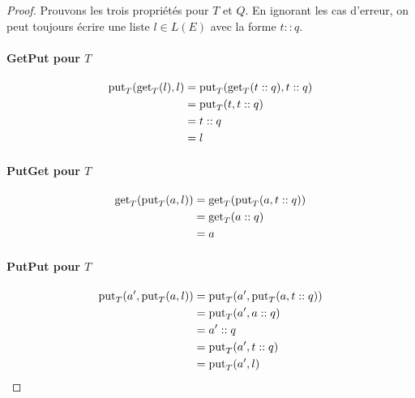 \begin{proof}%

Prouvons les trois propriétés pour $T$ et $Q$. En ignorant les cas d'erreur, on
peut toujours écrire une liste $l ∈ L(E)$ avec la forme $t::q$.

\paragraph{GetPut pour $T$}%

\begin{align*}
\mathrm{put}_{T}(\mathrm{get}_{T}(l), l) & = \mathrm{put}_{T}(\mathrm{get}_{T}(t::q), t::q) \\
                               & = \mathrm{put}_{T}(t, t::q) \\
                               & = t::q \\
                               & = l \\
\end{align*}%

\paragraph{PutGet pour $T$}%

\begin{align*}
\mathrm{get}_{T}(\mathrm{put}_{T}(a, l)) & = \mathrm{get}_{T}(\mathrm{put}_{T}(a, t::q)) \\
                               & = \mathrm{get}_{T}(a::q) \\
                               & = a \\
\end{align*}%

\paragraph{PutPut pour $T$}%

\begin{align*}
\mathrm{put}_{T}(a', \mathrm{put}_{T}(a, l)) & = \mathrm{put}_{T}(a', \mathrm{put}_{T}(a, t::q)) \\
                                   & = \mathrm{put}_{T}(a', a::q) \\
                                   & = a'::q \\
                                   & = \mathrm{put}_{T}(a', t::q) \\
                                   & = \mathrm{put}_{T}(a', l) \\
\end{align*}%


\end{proof}

